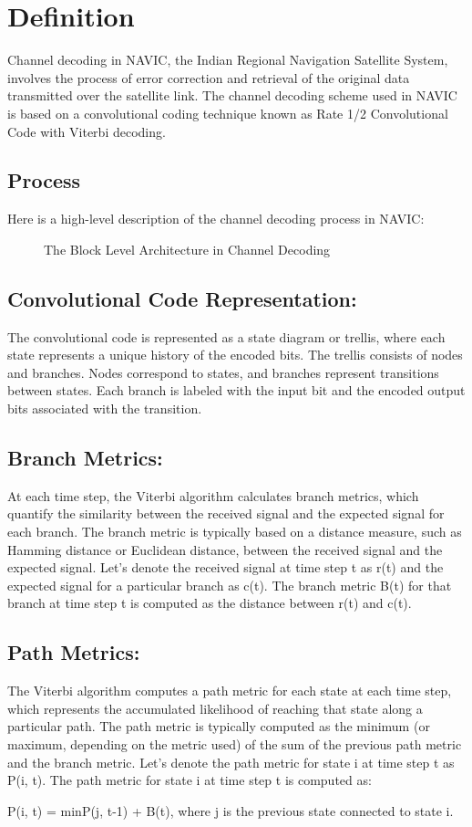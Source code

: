 \section{Definition}
Channel decoding in NAVIC, the Indian Regional Navigation Satellite System, involves the process of error correction and retrieval of the original data transmitted over the satellite link. The channel decoding scheme used in NAVIC is based on a convolutional coding technique known as Rate 1/2 Convolutional Code with Viterbi decoding.
\subsection{Process}
Here is a high-level description of the channel decoding process in NAVIC:
\begin{figure}[h!]
	\centering
	
	\caption{The Block Level Architecture in Channel Decoding}
	\label{figs:decoderBlock}
	\end{figure}


\subsection{Convolutional Code Representation:}

The convolutional code is represented as a state diagram or trellis, where each state represents a unique history of the encoded bits.
The trellis consists of nodes and branches. Nodes correspond to states, and branches represent transitions between states.
Each branch is labeled with the input bit and the encoded output bits associated with the transition.

\subsection{Branch Metrics:}
At each time step, the Viterbi algorithm calculates branch metrics, which quantify the similarity between the received signal and the expected signal for each branch.
The branch metric is typically based on a distance measure, such as Hamming distance or Euclidean distance, between the received signal and the expected signal.
Let's denote the received signal at time step t as r(t) and the expected signal for a particular branch as c(t). The branch metric B(t) for that branch at time step t is computed as the distance between r(t) and c(t).

\subsection{Path Metrics:}
The Viterbi algorithm computes a path metric for each state at each time step, which represents the accumulated likelihood of reaching that state along a particular path.
The path metric is typically computed as the minimum (or maximum, depending on the metric used) of the sum of the previous path metric and the branch metric.
Let's denote the path metric for state i at time step t as P(i, t). The path metric for state i at time step t is computed as:
\begin{center}
P(i, t) = min{P(j, t-1) + B(t)}, where j is the previous state connected to state i.
\end{center}

